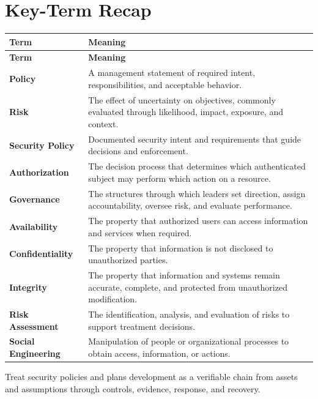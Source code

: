 \documentclass[11pt]{article}
\begin{document}
\section*{Key-Term Recap}
\begin{longtable}{>{\RaggedRight\arraybackslash}p{}>{\RaggedRight\arraybackslash}p{}}
\toprule\rowcolor{Navy}\color{white}\textbf{Term} & \color{white}\textbf{Meaning}\\\midrule
\endfirsthead
\toprule\rowcolor{Navy}\color{white}\textbf{Term} & \color{white}\textbf{Meaning}\\\midrule
\endhead
\textbf{Policy} & A management statement of required intent, responsibilities, and acceptable behavior. \\\midrule
\textbf{Risk} & The effect of uncertainty on objectives, commonly evaluated through likelihood, impact, exposure, and context. \\\midrule
\textbf{Security Policy} & Documented security intent and requirements that guide decisions and enforcement. \\\midrule
\textbf{Authorization} & The decision process that determines which authenticated subject may perform which action on a resource. \\\midrule
\textbf{Governance} & The structures through which leaders set direction, assign accountability, oversee risk, and evaluate performance. \\\midrule
\textbf{Availability} & The property that authorized users can access information and services when required. \\\midrule
\textbf{Confidentiality} & The property that information is not disclosed to unauthorized parties. \\\midrule
\textbf{Integrity} & The property that information and systems remain accurate, complete, and protected from unauthorized modification. \\\midrule
\textbf{Risk Assessment} & The identification, analysis, and evaluation of risks to support treatment decisions. \\\midrule
\textbf{Social Engineering} & Manipulation of people or organizational processes to obtain access, information, or actions. \\\midrule
\bottomrule
\end{longtable}
\begin{takeawaybox}
Treat security policies and plans development as a verifiable chain from assets and assumptions through controls, evidence, response, and recovery.
\end{takeawaybox}
\end{document}
